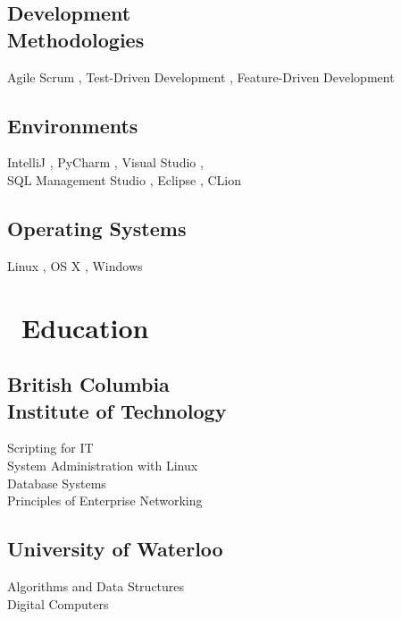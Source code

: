 \documentclass[]{ez-resume-config}
\begin{document}
\begin{minipage}[t]{0.33\textwidth}
\subsection{Development \\ Methodologies}
Agile Scrum ,{} Test-Driven Development 
,{} Feature-Driven Development
\sectionsep

\subsection{Environments}
IntelliJ ,{} PyCharm ,{} Visual Studio
,{} \\ SQL Management Studio ,{} Eclipse ,{} CLion
\sectionsep

\subsection{Operating Systems}
Linux ,{} OS X ,{} Windows
\sectionsep


\section{\faBook \ Education} 

\subsection{British Columbia \\ Institute of Technology}
Scripting for IT \\
System Administration with Linux \\
Database Systems \\
Principles of Enterprise Networking \\
\sectionsep

\subsection{University of Waterloo}
Algorithms and Data Structures \\
Digital Computers \\
\sectionsep

%
%

\end{minipage} 
\end{document}
